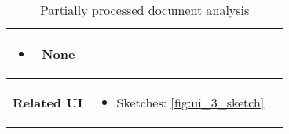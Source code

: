 \begin{table}[H]
\begin{tabularx}{0.75\linewidth}{||Sc|X||}
\begin{minipage}[l]{\linewidth}
\begin{itemize}[wide, labelindent=0pt]
                \item \textbf{None}
            \end{itemize}
        \end{minipage} \\
        \hline
        \textbf{Related UI} & 
        \begin{minipage}[l]{\linewidth}
            \begin{itemize}[wide, labelindent=0pt]
                \vspace{4pt}
                \item Sketches: \ref{fig:ui_3_sketch}
                \vspace{4pt}
            \end{itemize}
        \end{minipage} \\
        \hline
        \hline
    \end{tabularx}
    \caption{Partially processed document analysis}
    \label{tab:use_case_partially_processed}
\end{table}


